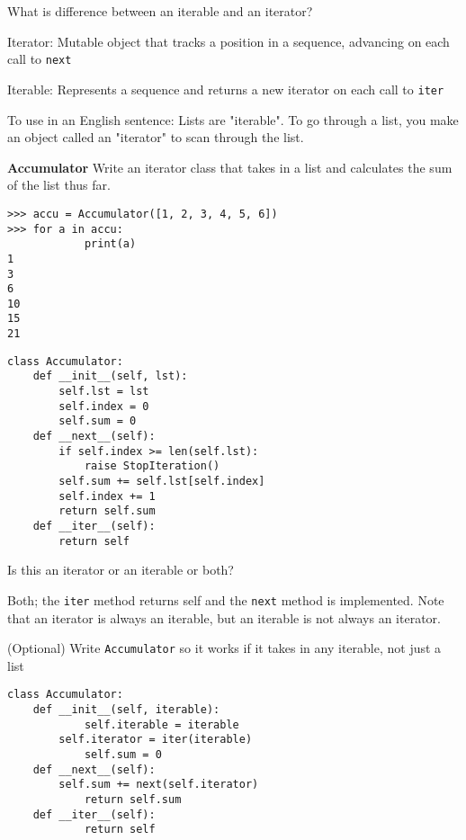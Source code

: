 \question What is difference between an iterable and an iterator?
\begin{solution}[0.5in]
Iterator: Mutable object that tracks a position in a sequence, advancing on each call to \texttt{next} 

Iterable: Represents a sequence and returns a new iterator on each call to \texttt{iter}

To use in an English sentence:
Lists are "iterable". To go through a list, you make an object called an "iterator" to scan through the list.
\end{solution}

\question \textbf{Accumulator} Write an iterator class that takes in a list and calculates the sum of the list thus far.
\begin{lstlisting}
>>> accu = Accumulator([1, 2, 3, 4, 5, 6])
>>> for a in accu:
            print(a)
1
3
6
10
15
21
\end{lstlisting}

\begin{solution}[1.5in]
\begin{lstlisting}
class Accumulator:
	def __init__(self, lst):
		self.lst = lst
		self.index = 0
		self.sum = 0
	def __next__(self):
		if self.index >= len(self.lst):
			raise StopIteration()
		self.sum += self.lst[self.index]
		self.index += 1
		return self.sum
	def __iter__(self):
		return self
\end{lstlisting}
\end{solution}

\question Is this an iterator or an iterable or both?
\begin{solution}[0.5in]
Both; the \texttt{iter} method returns self and the \texttt{next} method is implemented. Note that an iterator is always an iterable, but an iterable is not always an iterator.
\end{solution}

\question (Optional) Write \texttt{Accumulator} so it works if it takes in any iterable, not just a list

\begin{solution}[1.5in]
\begin{lstlisting}
class Accumulator:
	def __init__(self, iterable):
    		self.iterable = iterable
		self.iterator = iter(iterable)
            self.sum = 0
	def __next__(self):
    	self.sum += next(self.iterator)
    		return self.sum
	def __iter__(self):
    		return self
\end{lstlisting}
\end{solution}
